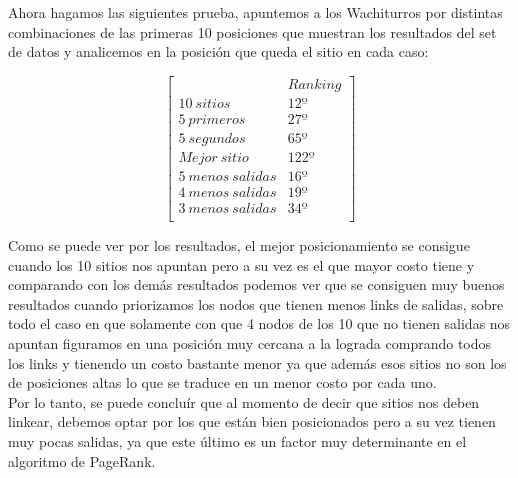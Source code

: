 Ahora hagamos las siguientes prueba, apuntemos a los Wachiturros por distintas combinaciones de las primeras 10 posiciones que muestran los resultados del set de datos y analicemos en la posición que queda el sitio en cada caso:

   $$ 
\begin{bmatrix}
              		&      Ranking \\
 10\ sitios 		&   	12º        \\
 5\ primeros   		&     	27º   \\
 5\ segundos   		&      	65º 	\\
 Mejor\ sitio   		&        122º    \\
 5\ menos\ salidas  	&        16º     \\
 4\ menos\ salidas  	&        19º  \\
 3\ menos\ salidas   	&     	34º \\
\end{bmatrix} 
$$

Como se puede ver por los resultados, el mejor posicionamiento se consigue cuando los 10 sitios nos apuntan pero a su vez es el que mayor costo tiene y comparando con los demás resultados podemos ver que se consiguen muy buenos resultados cuando priorizamos los nodos que tienen menos links de salidas, sobre todo el caso en que solamente con que 4 nodos de los 10 que no tienen salidas nos apuntan figuramos en una posición muy cercana a la lograda comprando todos los links y tienendo un costo bastante menor ya que además esos sitios no son los de posiciones altas lo que se traduce en un menor costo por cada uno.\\
Por lo tanto, se puede concluír que al momento de decir que sitios nos deben linkear, debemos optar por los que están bien posicionados pero a su vez tienen muy pocas salidas, ya que este último es un factor muy determinante en el algoritmo de PageRank. 





